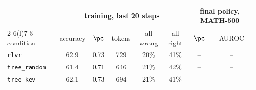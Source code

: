 \begin{tabular}{@{}lccccccc@{}}
\toprule
 & \multicolumn{5}{c}{training, last 20 steps} & \multicolumn{2}{c}{final policy, MATH-500} \\ \cmidrule(lr){2-6}\cmidrule(l){7-8}
condition & accuracy & \kev{} $\pc$ & tokens & all wrong & all right & \kev{} $\pc$ & \kev{} AUROC \\ \midrule
\texttt{rlvr} & 62.9 & 0.73 & 729 & 20\% & 41\% & -- & -- \\
\texttt{tree\_random} & 61.4 & 0.71 & 646 & 21\% & 42\% & -- & -- \\
\texttt{tree\_kev} & 62.1 & 0.73 & 694 & 21\% & 41\% & -- & -- \\
\bottomrule
\end{tabular}
